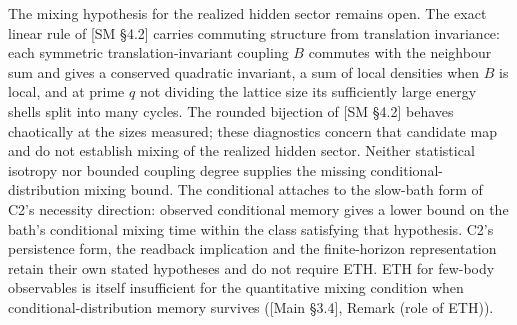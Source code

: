 \documentclass[
]{article}
\begin{document}
The mixing hypothesis for the realized hidden sector remains open. The
exact linear rule of {[}SM §4.2{]} carries commuting structure from
translation invariance: each symmetric translation-invariant coupling
\(B\) commutes with the neighbour sum and gives a conserved quadratic
invariant, a sum of local densities when \(B\) is local, and at prime
\(q\) not dividing the lattice size its sufficiently large energy shells
split into many cycles. The rounded bijection of {[}SM §4.2{]} behaves
chaotically at the sizes measured; these diagnostics concern that
candidate map and do not establish mixing of the realized hidden sector.
Neither statistical isotropy nor bounded coupling degree supplies the
missing conditional-distribution mixing bound. The conditional attaches
to the slow-bath form of C2's necessity direction: observed conditional
memory gives a lower bound on the bath's conditional mixing time within
the class satisfying that hypothesis. C2's persistence form, the
readback implication and the finite-horizon representation retain their
own stated hypotheses and do not require ETH. ETH for few-body
observables is itself insufficient for the quantitative mixing condition
when conditional-distribution memory survives ({[}Main §3.4{]}, Remark
(role of ETH)).
\end{document}

